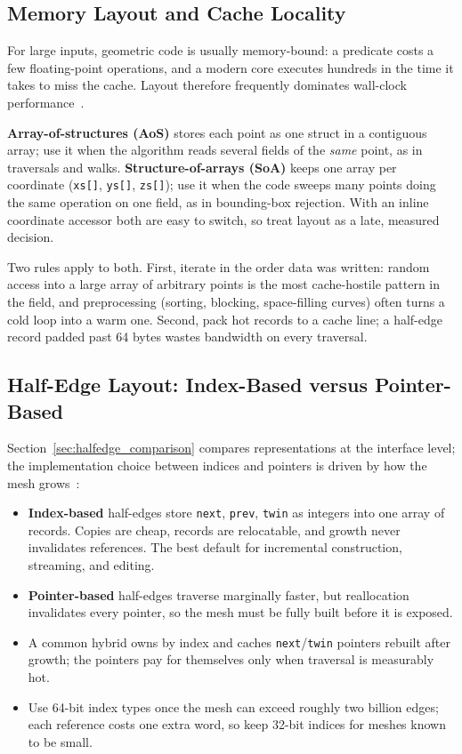 \subsection{Memory Layout and Cache Locality}
\label{sec:appimpl_layout}
For large inputs, geometric code is usually memory-bound: a predicate costs
a few floating-point operations, and a modern core executes hundreds in the
time it takes to miss the cache. Layout therefore frequently dominates
wall-clock performance~\cite{ericson2004}.

\textbf{Array-of-structures (AoS)} stores each
point as one struct in a contiguous array; use it when the algorithm reads
several fields of the \emph{same} point, as in traversals and walks.
\textbf{Structure-of-arrays (SoA)} keeps one
array per coordinate (\texttt{xs[]}, \texttt{ys[]}, \texttt{zs[]}); use it
when the code sweeps many points doing the same operation on one field, as
in bounding-box rejection. With an inline coordinate accessor both are
easy to switch, so treat layout as a late, measured decision.

Two rules apply to both. First, iterate in the order
data was written: random access into a large array of arbitrary points is
the most cache-hostile pattern in the field, and preprocessing (sorting,
blocking, space-filling curves) often turns a cold loop into a warm one.
Second, pack hot records to a cache line; a half-edge record padded past 64
bytes wastes bandwidth on every traversal.
\subsection{Half-Edge Layout: Index-Based versus Pointer-Based}
\label{sec:appimpl_halfedge_layout}
Section~\ref{sec:halfedge_comparison} compares representations at the
interface level; the implementation choice between indices and pointers is
driven by how the mesh grows~\cite{ericson2004}:

\begin{itemize}
  \item {}\textbf{Index-based} half-edges store
        \texttt{next}, \texttt{prev}, \texttt{twin} as integers into one
        array of records. Copies are cheap, records are relocatable, and
        growth never invalidates references. The best default for
        incremental construction, streaming, and editing.
  \item \textbf{Pointer-based} half-edges traverse marginally faster, but
        reallocation invalidates every pointer, so the mesh must be fully
        built before it is exposed.
  \item A common hybrid owns by index and caches
        \texttt{next}/\texttt{twin} pointers rebuilt after growth; the
        pointers pay for themselves only when traversal is measurably hot.
  \item {}Use 64-bit index types once the mesh can exceed
        roughly two billion edges; each reference costs one extra word, so
        keep 32-bit indices for meshes known to be small.
\end{itemize}

